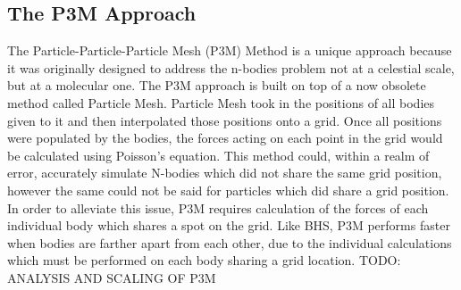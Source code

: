 \documentclass[11pt]{article}
\begin{document}
\begin{center}
\section*{The P3M Approach}
\end{center}
The Particle-Particle-Particle Mesh (P3M) Method is a unique approach because it was originally designed to address the n-bodies problem not at a celestial scale, but at a molecular one. The P3M approach is built on top of a now obsolete method called Particle Mesh.
\newline \newline
Particle Mesh took in the positions of all bodies given to it and then interpolated those positions onto a grid. Once all positions were populated by the bodies, the forces acting on each point in the grid would be calculated using Poisson's equation. This method could, within a realm of error, accurately simulate N-bodies which did not share the same grid position, however the same could not be said for particles which did share a grid position.
\newline \newline
In order to alleviate this issue, P3M requires calculation of the forces of each individual body which shares a spot on the grid. Like BHS, P3M performs faster when bodies are farther apart from each other, due to the individual calculations which must be performed on each body sharing a grid location.
\newline \newline
TODO: ANALYSIS AND SCALING OF P3M
\end{document}
